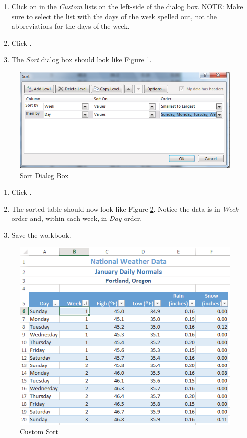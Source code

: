 \begin{enumerate}[resume]
	\item Click on  in the \textit{Custom} lists on the left-side of the dialog box. NOTE: Make sure to select the list with the days of the week spelled out, not the abbreviations for the days of the week.
	\item Click . 
	\item The \textit{Sort} dialog box should look like Figure \ref{05:fig14}.
\end{enumerate}

\begin{figure}[H]
	\centering
	\includegraphics[width=\maxwidth{.95\linewidth}]{gfx/ch05_fig14}
	\caption{Sort Dialog Box}
	\label{05:fig14}
\end{figure}

\begin{enumerate}
	\item Click .
	\item The sorted table should now look like Figure \ref{05:fig15}. Notice the data is in \textit{Week} order and, within each week, in \textit{Day} order.
\item Save the workbook.
\end{enumerate}

\begin{figure}[H]
	\centering
	\includegraphics[width=\maxwidth{.95\linewidth}]{gfx/ch05_fig15}
	\caption{Custom Sort}
	\label{05:fig15}
\end{figure}

